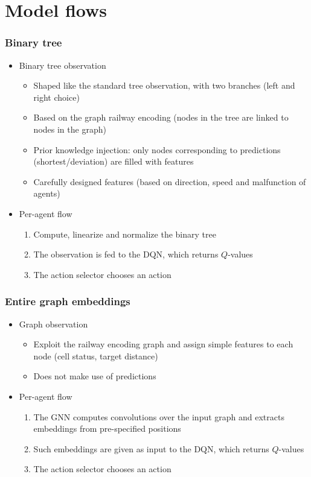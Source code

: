 \documentclass{beamer}
\begin{document}
\section{Model flows}
\begin{frame}
	\frametitle{Binary tree}
	\begin{itemize}
		\item Binary tree observation
		\begin{itemize}
			\item Shaped like the standard tree observation, with two branches (left and right choice)
			\item Based on the graph railway encoding (nodes in the tree are linked to nodes in the graph)
			\item Prior knowledge injection: only nodes corresponding to predictions (shortest/deviation) are filled with features
			\item Carefully designed features (based on direction, speed and malfunction of agents)
		\end{itemize}
		\item Per-agent flow
		\begin{enumerate}
			\item Compute, linearize and normalize the binary tree
			\item The observation is fed to the DQN, which returns $Q$-values
			\item The action selector chooses an action
		\end{enumerate}
	\end{itemize}
\end{frame}

\begin{frame}
	\frametitle{Entire graph embeddings}
	\begin{itemize}
		\item Graph observation
		\begin{itemize}
			\item Exploit the railway encoding graph and assign simple features to each node (cell status, target distance)
			\item Does not make use of predictions
		\end{itemize}
		\item Per-agent flow
		\begin{enumerate}
			\item The GNN computes convolutions over the input graph and extracts embeddings from pre-specified positions
			\item Such embeddings are given as input to the DQN, which returns $Q$-values
			\item The action selector chooses an action
		\end{enumerate}
	\end{itemize}
\end{frame}
\end{document}
